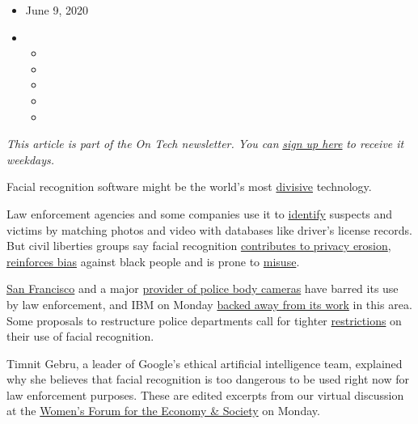 \begin{itemize}
\item
  June 9, 2020
\item
  \begin{itemize}
  \item
  \item
  \item
  \item
  \item
  \end{itemize}
\end{itemize}

\emph{This article is part of the On Tech newsletter. You can}
\href{https://www.nytimes3xbfgragh.onion/newsletters/signup/OT}{\emph{sign
up here}} \emph{to receive it weekdays.}

Facial recognition software might be the world's most
\href{https://www.nytimes3xbfgragh.onion/2019/05/15/business/facial-recognition-software-controversy.html}{divisive}
technology.

Law enforcement agencies and some companies use it to
\href{https://www.nytimes3xbfgragh.onion/2019/06/09/opinion/facial-recognition-police-new-york-city.html}{identify}
suspects and victims by matching photos and video with databases like
driver's license records. But civil liberties groups say facial
recognition
\href{https://www.nytimes3xbfgragh.onion/2020/01/18/technology/clearview-privacy-facial-recognition.html}{contributes
to privacy erosion},
\href{https://www.nytimes3xbfgragh.onion/2019/12/19/technology/facial-recognition-bias.html}{reinforces
bias} against black people and is prone to
\href{https://www.washingtonpost.com/technology/2019/04/30/amazons-facial-recognition-technology-is-supercharging-local-police/}{misuse}.

\href{https://www.nytimes3xbfgragh.onion/2019/05/14/us/facial-recognition-ban-san-francisco.html}{San
Francisco} and a major
\href{https://www.nytimes3xbfgragh.onion/2019/06/27/opinion/police-cam-facial-recognition.html}{provider
of police body cameras} have barred its use by law enforcement, and IBM
on Monday
\href{https://www.axios.com/ibm-is-exiting-the-face-recognition-business-62e79f09-34a2-4f1d-a541-caba112415c6.html}{backed
away from its work} in this area. Some proposals to restructure police
departments call for tighter
\href{https://www.protocol.com/police-facial-recognition-legislation}{restrictions}
on their use of facial recognition.

Timnit Gebru, a leader of Google's ethical artificial intelligence team,
explained why she believes that facial recognition is too dangerous to
be used right now for law enforcement purposes. These are edited
excerpts from our virtual discussion at the
\href{http://www.womens-forum.com/}{Women's Forum for the Economy \&
Society} on Monday.

